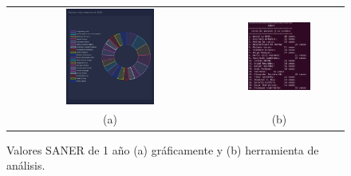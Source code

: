 \documentclass[a4paper, 12pt]{book}
\begin{document}
\begin{figure}[!h]
    \centering
    \begin{tabular}{cc}
    \includegraphics[width=0.45\textwidth]{img/saner_1_year_graph.png} &  
    \includegraphics[width=0.52\textwidth]{img/saner_1_year.png} \\ 
    (a) &(b) 
    \end{tabular}
    \caption{Valores SANER de 1 año (a) gráficamente y (b) herramienta de análisis.}
    \label{fig:comp_saner_1_year}
\end{figure}
\end{document}
